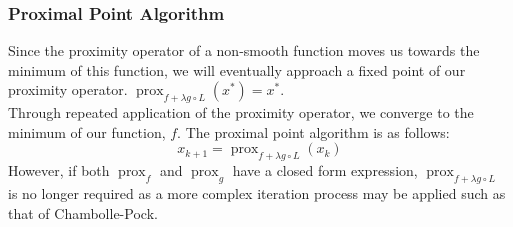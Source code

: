 \documentclass[12pt]{article}
\begin{document}
\subsubsection{Proximal Point Algorithm}
Since the proximity operator of a non-smooth function moves us towards the minimum of this function, we will eventually approach a fixed point of our proximity operator. $\operatorname{prox}_{f + \lambda g \circ L}{(x^{*})} = x^{*}$. \\

Through repeated application of the proximity operator, we converge to the minimum of our function, $f$. The proximal point algorithm is as follows: 
\begin{equation}
    x_{k+1} = \operatorname{prox}_{f + \lambda g \circ L}{(x_k)}    
\end{equation}
However, if both $\operatorname{prox}_f$ and $\operatorname{prox}_g$ have a closed form expression, $\operatorname{prox}_{f + \lambda g \circ L}$ is no longer required as a more complex iteration process may be applied such as that of Chambolle-Pock\cite{chambolle-pock}. 





\end{document}
